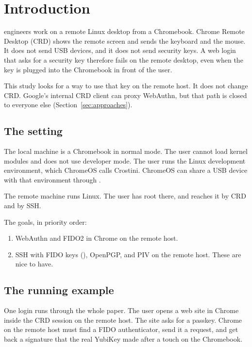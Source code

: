 \section{Introduction}
\label{sec:intro}

 engineers work on a remote Linux desktop from a
Chromebook. Chrome Remote Desktop (CRD) shows the remote screen and sends the
keyboard and the mouse. It does not send USB devices, and it does not send
security keys. A web login that asks for a security key therefore fails on
the remote desktop, even when the key is plugged into the Chromebook in front
of the user.

This study looks for a way to use that key on the remote host. It does not
change CRD. Google's internal CRD client can proxy WebAuthn, but that path is
closed to everyone else (Section~\ref{sec:approaches}).

\subsection{The setting}

The local machine is a Chromebook in normal mode. The user cannot load kernel
modules and does not use developer mode. The user runs the Linux development
environment, which ChromeOS calls Crostini. ChromeOS can share a USB device
with that environment through .

The remote machine runs Linux. The user has root there, and reaches it by CRD
and by SSH.

The goals, in priority order:
\begin{enumerate}
\item WebAuthn and FIDO2 in Chrome on the remote host.
\item SSH with FIDO keys (), OpenPGP, and PIV on the remote
      host. These are nice to have.
\end{enumerate}

\subsection{The running example}

One login runs through the whole paper. The user opens a web site in Chrome
inside the CRD session on the remote host. The site asks for a passkey. Chrome
on the remote host must find a FIDO authenticator, send it a
 request, and get back a signature that the real YubiKey
made after a touch on the Chromebook.

